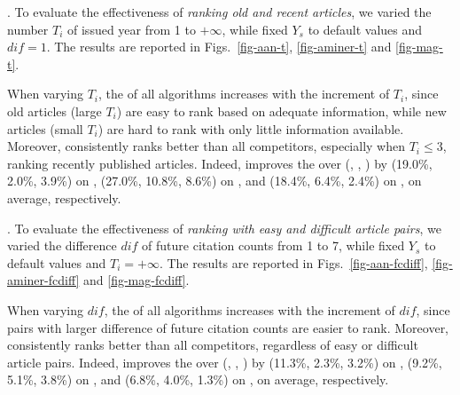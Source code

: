 .
To evaluate the effectiveness of {\em ranking old and recent articles},
we varied the number $T_i$ of issued year from 1 to $+\infty$, while fixed $Y_s$ to default values and $dif=1$. The results are reported in Figs.~\ref{fig-aan-t}, \ref{fig-aminer-t} and \ref{fig-mag-t}.


When varying $T_i$, the \PairAcc of all algorithms increases with the increment of $T_i$, since old articles (large $T_i$) are easy to rank based on adequate information, while new articles (small $T_i$) are hard to rank with only little information available. Moreover, \ensemblerank consistently ranks better than all competitors, especially when $T_i\le3$, \ie ranking recently published articles. Indeed, \ensemblerank improves the \PairAcc over (\pagerank, \futurerank, \hhgrank) by (19.0\%, 2.0\%, 3.9\%) on \aan, (27.0\%, 10.8\%, 8.6\%) on \aminer, and (18.4\%, 6.4\%, 2.4\%) on \magdata, on average, respectively.


.
To evaluate the effectiveness of {\em ranking with easy and difficult article pairs},
we varied the difference $dif$ of future citation counts from 1 to 7, while fixed $Y_s$ to default values and $T_i=+\infty$. The results are reported in Figs.~\ref{fig-aan-fcdiff}, \ref{fig-aminer-fcdiff} and \ref{fig-mag-fcdiff}.


When varying $dif$, the \PairAcc of all algorithms increases with the increment of $dif$, since pairs with larger difference of future citation counts are easier to rank. Moreover, \ensemblerank consistently ranks better than all competitors, regardless of easy or difficult article pairs. Indeed, \ensemblerank improves the \PairAcc over (\pagerank, \futurerank, \hhgrank) by (11.3\%, 2.3\%, 3.2\%) on \aan, (9.2\%, 5.1\%, 3.8\%) on \aminer, and (6.8\%, 4.0\%, 1.3\%) on \magdata, on average, respectively.




